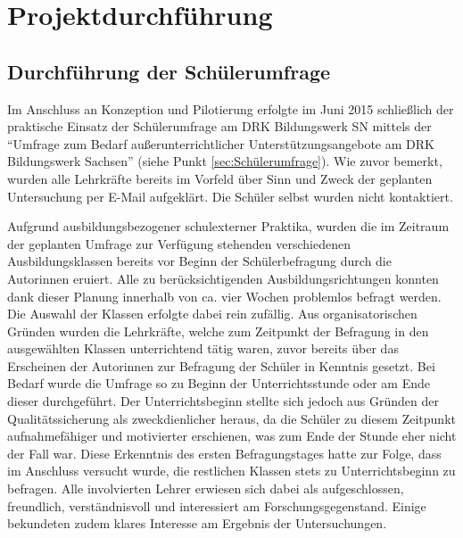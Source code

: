 \section{Projektdurchführung}
\label{sec:Projektdurchführung}

\subsection{Durchführung der Schülerumfrage}
\label{sec:DurchführungDerSchülerumfrage}

Im Anschluss an Konzeption und Pilotierung erfolgte im Juni 2015 schließlich der praktische Einsatz der Schülerumfrage am DRK Bildungswerk SN mittels der "`Umfrage zum Bedarf außerunterrichtlicher Unterstützungsangebote am DRK Bildungswerk Sachsen"' (siehe Punkt \ref{sec:Schülerumfrage}). Wie zuvor bemerkt, wurden alle Lehrkräfte bereits im Vorfeld über Sinn und Zweck der geplanten Untersuchung per E-Mail aufgeklärt. Die Schüler selbst wurden nicht kontaktiert. 

Aufgrund ausbildungsbezogener schulexterner Praktika, wurden die im Zeitraum der geplanten Umfrage zur Verfügung stehenden verschiedenen Ausbildungsklassen bereits vor Beginn der Schülerbefragung durch die Autorinnen eruiert. Alle zu berücksichtigenden Ausbildungsrichtungen konnten dank dieser Planung innerhalb von ca. vier Wochen problemlos befragt werden. Die Auswahl der Klassen erfolgte dabei rein zufällig. Aus organisatorischen Gründen wurden die Lehrkräfte, welche zum Zeitpunkt der Befragung in den ausgewählten Klassen unterrichtend tätig waren, zuvor bereits über das Erscheinen der Autorinnen zur Befragung der Schüler in Kenntnis gesetzt. Bei Bedarf wurde die Umfrage so zu Beginn der Unterrichtsstunde oder am Ende dieser durchgeführt. Der Unterrichtsbeginn stellte sich jedoch aus Gründen der Qualitätssicherung als zweckdienlicher heraus, da die Schüler zu diesem Zeitpunkt aufnahmefähiger und motivierter erschienen, was zum Ende der Stunde eher nicht der Fall war. Diese Erkenntnis des ersten Befragungstages hatte zur Folge, dass im Anschluss versucht wurde, die restlichen Klassen stets zu Unterrichtsbeginn zu befragen. Alle involvierten Lehrer erwiesen sich dabei als aufgeschlossen, freundlich, verständnisvoll und interessiert am Forschungsgegenstand. Einige bekundeten zudem klares Interesse am Ergebnis der Untersuchungen. 

